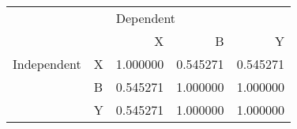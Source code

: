 \begin{tabular}{llrrr}
\toprule
            &   & \multicolumn{3}{l}{Dependent} \\
            &   &         X &         B &         Y \\
\midrule
Independent & X &  1.000000 &  0.545271 &  0.545271 \\
            & B &  0.545271 &  1.000000 &  1.000000 \\
            & Y &  0.545271 &  1.000000 &  1.000000 \\
\bottomrule
\end{tabular}
